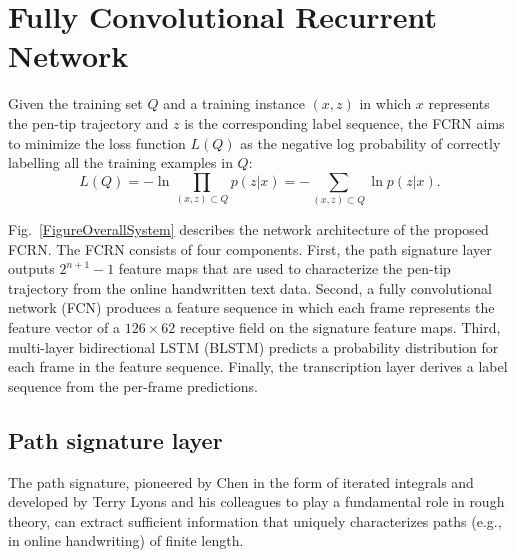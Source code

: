 \documentclass[10pt,conference,a4paper]{IEEEtran}
\begin{document}
\section{Fully Convolutional Recurrent Network}
Given the training set $Q$ and a training instance $(x,z)$ in which $x$ represents the pen-tip trajectory and $z$ is the corresponding label sequence, the FCRN aims to minimize the loss function $L(Q)$ as the negative log probability of correctly labelling all the training examples in $Q$:
\begin{equation}
    L(Q)=-\ln \prod_{(x,z)\subset Q} p(z|x) = - \sum_{(x,z)\subset Q} \ln p(z|x).
\end{equation}


Fig.~\ref{FigureOverallSystem} describes the network architecture of the proposed FCRN.
The FCRN consists of four components.
First, the path signature layer outputs $2^{n+1}-1$ feature maps that are used to characterize the pen-tip trajectory from the online handwritten text data.
Second, a fully convolutional network (FCN) produces a feature sequence in which each frame represents the feature vector of a $126 \times 62$ receptive field on the signature feature maps.
Third, multi-layer bidirectional LSTM (BLSTM) predicts a probability distribution for each frame in the feature sequence.
Finally, the transcription layer derives a label sequence from the per-frame predictions.



\subsection{Path signature layer}
The path signature, pioneered by Chen\cite{chen1958integration} in the form of iterated integrals and developed by Terry Lyons and his colleagues to play a fundamental role in rough theory\cite{hambly2010uniqueness,lyonssystem,lyons2014rough}, can extract sufficient information that uniquely characterizes paths (e.g., in online handwriting) of finite length.
\end{document}

